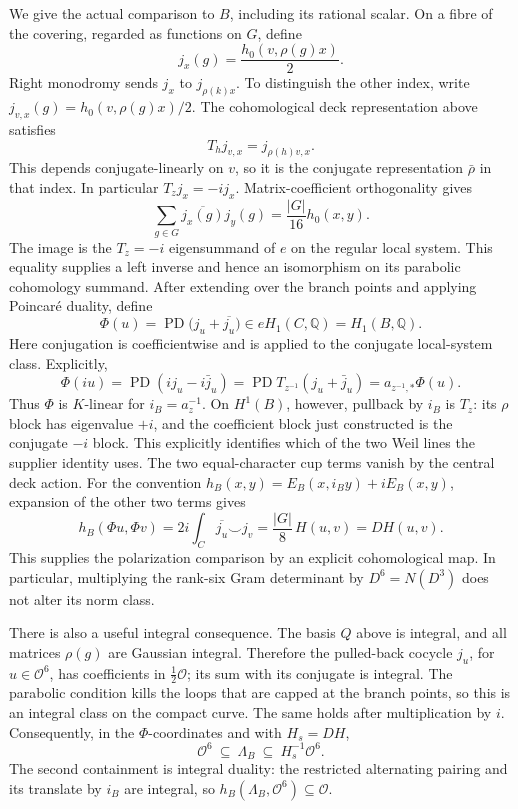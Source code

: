 We give the actual comparison to \(B\), including its rational scalar.
On a fibre of the covering, regarded as functions on \(G\), define
\[
 j_x(g)=\frac{h_0(v,\rho(g)x)}2.
\]
Right monodromy sends \(j_x\) to \(j_{\rho(k)x}\). To distinguish
the other index, write \(j_{v,x}(g)=h_0(v,\rho(g)x)/2\). The
cohomological deck representation above satisfies
\[
 T_hj_{v,x}=j_{\rho(h)v,x}.
\]
This depends conjugate-linearly on \(v\), so it is the conjugate
representation \(\bar\rho\) in that index. In particular
\(T_zj_x=-ij_x\).
Matrix-coefficient orthogonality gives
\[
 \sum_{g\in G}\overline{j_x(g)}j_y(g)
       =\frac{|G|}{16}h_0(x,y).
\]
The image is the \(T_z=-i\) eigensummand of \(e\) on the regular
local system. This equality supplies a left inverse and hence an
isomorphism on its parabolic cohomology summand. After extending over
the branch points and applying Poincar\'e duality, define
\[
 \Phi(u)=\operatorname{PD}\bigl(j_u+\overline{j_u}\bigr)
       \in eH_1(C,\mathbb Q)=H_1(B,\mathbb Q).
\]
Here conjugation is coefficientwise and is applied to the conjugate
local-system class. Explicitly,
\[
 \Phi(iu)=\operatorname{PD}(ij_u-i\bar j_u)
        =\operatorname{PD}T_{z^{-1}}(j_u+\bar j_u)
        =a_{z^{-1},*}\Phi(u).
\]
Thus \(\Phi\) is \(K\)-linear for \(i_B=a_z^{-1}\). On
\(H^1(B)\), however, pullback by \(i_B\) is \(T_z\): its
\(\rho\) block has eigenvalue \(+i\), and the coefficient block
just constructed is the conjugate \(-i\) block. This explicitly
identifies which of the two Weil lines the supplier identity uses.
The two equal-character cup terms vanish by the central deck action.
For the convention
\(h_B(x,y)=E_B(x,i_By)+iE_B(x,y)\), expansion of the other two
terms gives
\begin{equation}\label{eq:e8-source-gram}
 h_B(\Phi u,\Phi v)
   =2i\int_C\overline{j_u}\smile j_v
   =\frac{|G|}{8}\,H(u,v)=D H(u,v).
\end{equation}
This supplies the polarization comparison by an explicit cohomological
map. In particular, multiplying the rank-six Gram determinant by
\(D^6=N(D^3)\) does not alter its norm class.

There is also a useful integral consequence. The basis \(Q\) above is
integral, and all matrices \(\rho(g)\) are Gaussian integral.
Therefore the pulled-back cocycle \(j_u\), for \(u\in\mathcal O^6\),
has coefficients in \(\tfrac12\mathcal O\); its sum with its conjugate
is integral. The parabolic condition kills the loops that are capped
at the branch points, so this is an integral class on the compact curve.
The same holds after multiplication by \(i\). Consequently, in the
\(\Phi\)-coordinates and with \(H_s=DH\),
\begin{equation}\label{eq:e8-source-lattice-sandwich}
 \mathcal O^6\ \subseteq\ \Lambda_B\ \subseteq\ H_s^{-1}\mathcal O^6.
\end{equation}
The second containment is integral duality: the restricted alternating
pairing and its translate by \(i_B\) are integral, so
\(h_B(\Lambda_B,\mathcal O^6)\subseteq\mathcal O\).

